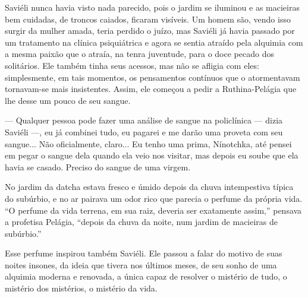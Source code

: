 Saviéli nunca havia visto nada parecido, pois o jardim se iluminou e as
macieiras bem cuidadas, de troncos caiados, ficaram visíveis. Um homem
são, vendo isso surgir da mulher amada, teria perdido o juízo, mas
Saviéli já havia passado por um tratamento na clínica psiquiátrica e
agora se sentia atraído pela alquimia com a mesma paixão que o atraía,
na tenra juventude, para o doce pecado dos solitários. Ele também tinha
seus acessos, mas não se afligia com eles: simplesmente, em tais
momentos, os pensamentos contínuos que o atormentavam tornavam-se mais
insistentes. Assim, ele começou a pedir a Ruthina-Pelágia que lhe desse
um pouco de seu sangue.

--- Qualquer pessoa pode fazer uma análise de sangue na policlínica ---
dizia Saviéli ---, eu já combinei tudo, eu pagarei e me darão uma
proveta com seu sangue... Não oficialmente, claro... Eu tenho uma prima,
Nínotchka, até pensei em pegar o sangue dela quando ela veio nos
visitar, mas depois eu soube que ela havia se casado. Preciso do sangue
de uma virgem.

No jardim da datcha estava fresco e úmido depois da chuva intempestiva
típica do subúrbio, e no ar pairava um odor rico que parecia o perfume
da própria vida. ``O perfume da vida terrena, em sua raiz, deveria ser
exatamente assim,'' pensava a profetisa Pelágia, ``depois da chuva da
noite, num jardim de macieiras de subúrbio.''

Esse perfume inspirou também Saviéli. Ele passou a falar do motivo de
suas noites insones, da ideia que tivera nos últimos meses, de seu sonho
de uma alquimia moderna e renovada, a única capaz de resolver o mistério
de tudo, o mistério dos mistérios, o mistério da vida.

